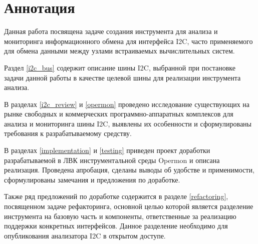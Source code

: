 \section*{Аннотация}

Данная работа посвящена задаче создания инструмента для анализа и мониторинга информационного обмена для интерфейса I2C, часто применяемого для обмена данными между узлами встраиваемых вычислительных систем.

Раздел \ref{i2c_bus} содержит описание шины I2C, выбранной при постановке задачи данной работы в качестве целевой шины для реализации инструмента анализа.

В разделах \ref{i2c_review} и \ref{opermon} проведено исследование существующих на рынке свободных и коммерческих программно-аппаратных комплексов для анализа и мониторинга шины I2C, выявлены их особенности и сформулированы требования к разрабатываемому средству.

В разделах \ref{implementation} и \ref{testing} приведен проект доработки разрабатываемой в ЛВК инструментальной среды Opermon и описана реализация. Проведена апробация, сделаны выводы об удобстве и применимости, сформулированы замечания и предложения по доработке.

Также ряд предложений по доработке содержится в разделе \ref{refactoring}, посвященном задаче рефакторинга, основной целью которой является разделение
инструмента на базовую часть и компоненты, ответственные за реализацию поддержки конкретных интерфейсов. Данное разделение необходимо для опубликования анализатора I2C в открытом доступе.
